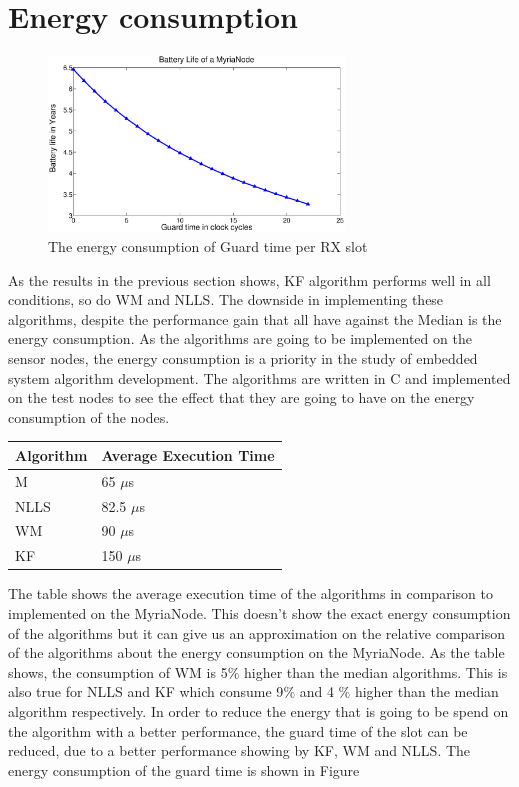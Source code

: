 \documentclass[a4paper,10pt]{report}
\begin{document}
\section{\textbf{Energy consumption}}
\begin{figure}
\centering
\includegraphics[width=0.7\textwidth]{guardsave}
\caption{The energy consumption of Guard time per RX slot}
\label{energyguard}
\end{figure}
As the results in the previous section shows, KF algorithm performs well in all conditions, so do WM and NLLS. The downside in
implementing these algorithms, despite the performance gain that all have against the Median is the energy consumption. As the algorithms are going to be implemented on the sensor nodes, the energy consumption is a priority in the study of embedded system algorithm development. The algorithms are written in C and implemented on the test nodes to see the effect that they are going to have on the energy consumption of the nodes.
\begin{center}
    \begin{tabular}{ |p{2cm} | p{4.75cm} |}
    \hline
    Algorithm & Average Execution Time \\ \hline
    M &  65 $\mu$s \\ \hline
    NLLS & 82.5 $\mu$s \\ \hline
    WM &   90 $\mu$s \\ \hline
    KF &  150 $\mu$s  \\ \hline
    \end{tabular}
\label{tab}
\end{center}
The table shows the average execution time of the algorithms in comparison to implemented on the MyriaNode. This doesn't show the
exact energy consumption of the algorithms but it can give us an approximation on the relative comparison of the algorithms about the energy consumption on the MyriaNode. As the table shows, the consumption of WM is 5$\%$ higher than the median algorithms. This
is also true for NLLS and KF which consume 9$\%$ and 4 $\%$ higher than the median algorithm respectively. \newline In order to reduce the energy that is going to be spend on the algorithm with a better performance, the guard time of the slot can be reduced, due to a better performance showing by KF, WM and NLLS. The energy consumption of the guard time is shown in Figure
\end{document}

